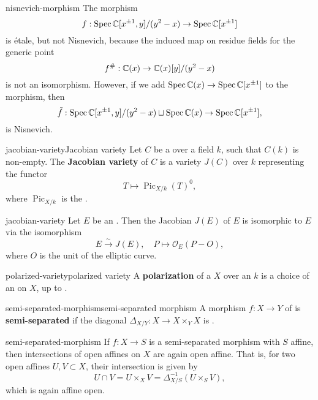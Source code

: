 \begin{example}{nisnevich-morphism}
    The morphism
    \[ f : \operatorname{Spec} \mathbb{C}[x^{\pm 1}, y] / (y^2 - x) \to \operatorname{Spec} \mathbb{C}[x^{\pm 1}] \]
    is étale, but not Nisnevich, because the induced map on residue fields for the generic point
    \[ f^\# : \mathbb{C}(x) \to \mathbb{C}(x)[y] / (y^2 - x) \]
    is not an isomorphism. However, if we add $\operatorname{Spec} \mathbb{C}(x) \to \operatorname{Spec} \mathbb{C}[x^{\pm 1}]$ to the morphism, then
    \[ \tilde{f} : \operatorname{Spec} \mathbb{C}[x^{\pm 1}, y] / (y^2 - x) \sqcup \operatorname{Spec} \mathbb{C}(x) \to \operatorname{Spec} \mathbb{C}[x^{\pm 1}] , \]
    is Nisnevich.
\end{example}

\begin{topic}{jacobian-variety}{Jacobian variety}
    Let $C$ be a    over a field $k$, such that $C(k)$ is non-empty.
    The \textbf{Jacobian variety} of $C$ is a variety $J(C)$ over $k$ representing the functor
    \[ T \mapsto \operatorname{Pic}_{X/k}(T)^0 , \]
    where $\operatorname{Pic}_{X/k}$ is the .
\end{topic}

\begin{example}{jacobian-variety}
    Let $E$ be an . Then the Jacobian $J(E)$ of $E$ is isomorphic to $E$ via the isomorphism
    \[ E \xrightarrow{\sim} J(E), \quad P \mapsto \mathcal{O}_E(P - O) , \]
    where $O$ is the unit of the elliptic curve.
\end{example}

\begin{topic}{polarized-variety}{polarized variety}
    A \textbf{polarization} of a  $X$ over an  $k$ is a choice of an  on $X$, up to .
\end{topic}

\begin{topic}{semi-separated-morphism}{semi-separated morphism}
    A morphism $f : X \to Y$ of  is \textbf{semi-separated} if the diagonal $\Delta_{X/Y} : X \to X \times_Y X$ is .
\end{topic}

\begin{example}{semi-separated-morphism}
    If $f : X \to S$ is a semi-separated morphism with $S$ affine, then intersections of open affines on $X$ are again open affine. That is, for two open affines $U, V \subset X$, their intersection is given by
    \[ U \cap V = U \times_X V = \Delta_{X/S}^{-1}(U \times_S V) , \]
    which is again affine open.
\end{example}

